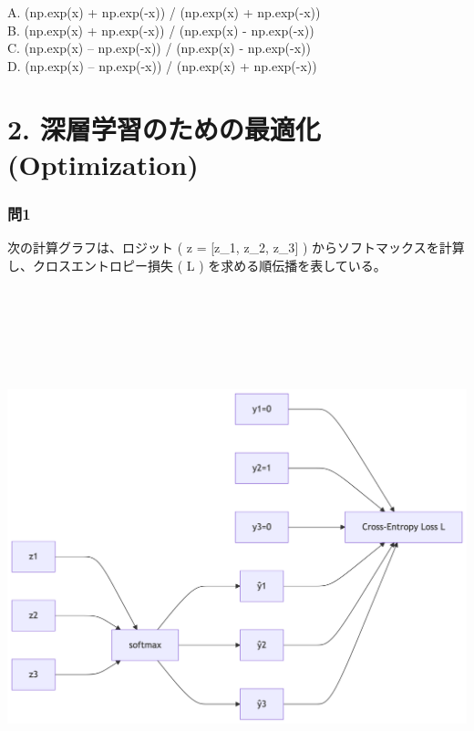 \documentclass[
  letterpaper,
  DIV=11,
  numbers=noendperiod]{scrreprt}
\begin{document}
A. (np.exp(x) + np.exp(-x)) / (np.exp(x) + np.exp(-x))\\
B. (np.exp(x) + np.exp(-x)) / (np.exp(x) - np.exp(-x))\\
C. (np.exp(x) -- np.exp(-x)) / (np.exp(x) - np.exp(-x))\\
D. (np.exp(x) -- np.exp(-x)) / (np.exp(x) + np.exp(-x))

\chapter{2. 深層学習のための最適化
(Optimization)}\label{ux6df1ux5c64ux5b66ux7fd2ux306eux305fux3081ux306eux6700ux9069ux5316-optimization}

\subsection{問1}\label{ux554f1-1}

次の計算グラフは、ロジット ( z = {[}z\_1, z\_2, z\_3{]} )
からソフトマックスを計算し、クロスエントロピー損失 ( L )
を求める順伝播を表している。

\includegraphics[width=8.42in,height=6.15in]{chapters/part3/02_optimization_files/figure-latex/mermaid-figure-1.png}
\end{document}
